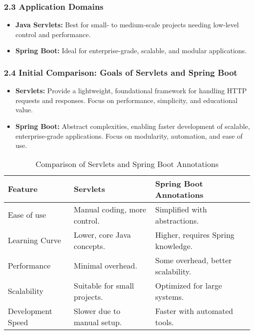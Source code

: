 \subsubsection{2.3 Application Domains}
\begin{itemize}
    \item \textbf{Java Servlets:} Best for small- to medium-scale projects needing low-level control and performance.
    \item \textbf{Spring Boot:} Ideal for enterprise-grade, scalable, and modular applications.
\end{itemize}

\subsubsection{2.4 Initial Comparison: Goals of Servlets and Spring Boot}
\begin{itemize}
    \item \textbf{Servlets:} Provide a lightweight, foundational framework for handling HTTP requests and responses. Focus on performance, simplicity, and educational value.
    \item \textbf{Spring Boot:} Abstract complexities, enabling faster development of scalable, enterprise-grade applications. Focus on modularity, automation, and ease of use.
\end{itemize}

\begin{table}[h!]
    \centering
    \begin{tabular}{|l|l|l|}
        \hline
        \textbf{Feature} & \textbf{Servlets} & \textbf{Spring Boot Annotations} \\
        \hline
        Ease of use & Manual coding, more control. & Simplified with abstractions. \\
        \hline
        Learning Curve & Lower, core Java concepts. & Higher, requires Spring knowledge. \\
        \hline
        Performance & Minimal overhead. & Some overhead, better scalability. \\
        \hline
        Scalability & Suitable for small projects. & Optimized for large systems. \\
        \hline
        Development Speed & Slower due to manual setup. & Faster with automated tools. \\
        \hline
    \end{tabular}
    \caption{Comparison of Servlets and Spring Boot Annotations}
    \label{tab:servlet_springboot_comparison}
\end{table}

